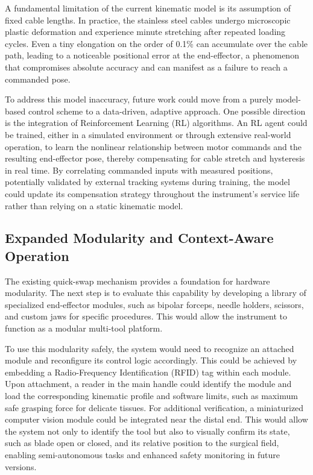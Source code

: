 A fundamental limitation of the current kinematic model is its assumption of fixed cable lengths. In practice, the stainless steel cables undergo microscopic plastic deformation and experience minute stretching after repeated loading cycles. Even a tiny elongation on the order of 0.1\% can accumulate over the cable path, leading to a noticeable positional error at the end-effector, a phenomenon that compromises absolute accuracy and can manifest as a failure to reach a commanded pose.

To address this model inaccuracy, future work could move from a purely model-based control scheme to a data-driven, adaptive approach. One possible direction is the integration of Reinforcement Learning (RL) algorithms. An RL agent could be trained, either in a simulated environment or through extensive real-world operation, to learn the nonlinear relationship between motor commands and the resulting end-effector pose, thereby compensating for cable stretch and hysteresis in real time. By correlating commanded inputs with measured positions, potentially validated by external tracking systems during training, the model could update its compensation strategy throughout the instrument's service life rather than relying on a static kinematic model.

\subsection{Expanded Modularity and Context-Aware Operation}

The existing quick-swap mechanism provides a foundation for hardware modularity. The next step is to evaluate this capability by developing a library of specialized end-effector modules, such as bipolar forceps, needle holders, scissors, and custom jaws for specific procedures. This would allow the instrument to function as a modular multi-tool platform.

To use this modularity safely, the system would need to recognize an attached module and reconfigure its control logic accordingly. This could be achieved by embedding a Radio-Frequency Identification (RFID) tag within each module. Upon attachment, a reader in the main handle could identify the module and load the corresponding kinematic profile and software limits, such as maximum safe grasping force for delicate tissues. For additional verification, a miniaturized computer vision module could be integrated near the distal end. This would allow the system not only to identify the tool but also to visually confirm its state, such as blade open or closed, and its relative position to the surgical field, enabling semi-autonomous tasks and enhanced safety monitoring in future versions.

